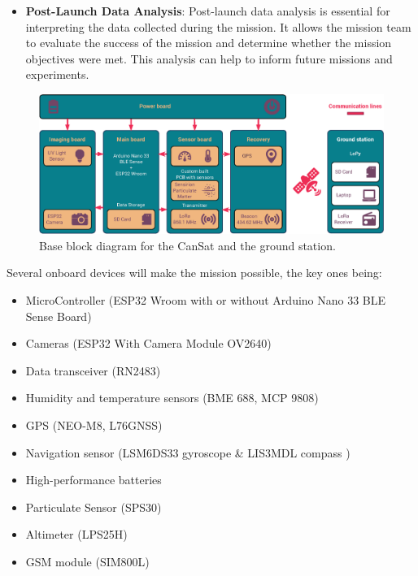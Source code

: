 \documentclass[11pt]{article}
\begin{document}
\begin{itemize}[leftmargin=1.27cm, itemindent=0cm, topsep=2pt, label=\faTasks]
    \item[\faChartBar] \textbf{Post-Launch Data Analysis}: Post-launch data analysis is essential for interpreting the data collected during the mission. It allows the mission team to evaluate the success of the mission and determine whether the mission objectives were met. This analysis can help to inform future missions and experiments. 
\end{itemize}

\begin{figure}[htbp]
\centering
\includegraphics[width=\linewidth]{images/img_Block_Diagram_2023.eps}
\caption{\small{Base block diagram for the CanSat and the ground station.}}
\label{fig:bloc_diagrame}
\end{figure}

Several onboard devices will make the mission possible, the key ones being:
    \begin{multicols}{2}[\vspace{-0.5\baselineskip}]
        \begin{itemize}[leftmargin=1.75cm,itemindent=0cm, noitemsep, topsep=2pt, label=\faCheck]
            \item[\faMicrochip] MicroController (ESP32 Wroom with or without Arduino Nano 33 BLE Sense Board)
            \item[\faCamera] Cameras (ESP32 With Camera Module OV2640)
            \item[ \faWifi] Data transceiver (RN2483)
            \item[\faThermometerQuarter] Humidity and temperature sensors (BME 688, MCP 9808)
            \item[\faMapMarked] GPS (NEO-M8, L76GNSS)
            \item[\faCompass] Navigation sensor (LSM6DS33 gyroscope \& LIS3MDL compass )
            \item[\faBatteryHalf] High-performance batteries
            \item[\faCloudversify] Particulate Sensor (SPS30)
            \item[\newaltitudeicon] Altimeter (LPS25H)
            \item[\newgsmicon] GSM module (SIM800L)
        \end{itemize}
        \vspace*{-0.75\baselineskip}
    \end{multicols}
\end{document}
